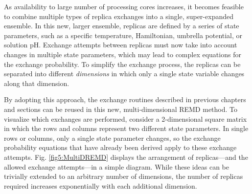 As availability to large number of processing cores increases, it becomes
feasible to combine multiple types of replica exchanges into a single,
super-expanded ensemble. In this new, larger ensemble, replicas are defined by a
series of state parameters, such as a specific temperature, Hamiltonian,
umbrella potential, or solution pH. Exchange attempts between replicas must now
take into account changes in multiple state parameters, which may lead to
complex equations for the exchange probability. To simplify the exchange
process, the replicas can be separated into different \emph{dimensions} in which
only a single state variable changes along that dimension.

By adopting this approach, the exchange routines described in previous chapters
and sections can be reused in this new, multi-dimensional REMD method. To
visualize which exchanges are performed, consider a 2-dimensional square matrix
in which the rows and columns represent two different state parameters. In
single rows or columns, only a single state parameter changes, so the exchange
probability equations that have already been derived apply to these exchange
attempts. Fig. \ref{fig5:MultiDREMD} displays the arrangement of replicas---and
the allowed exchange attempts---in a simple diagram. While these ideas can be
trivially extended to an arbitrary number of dimensions, the number of replicas
required increases exponentially with each additional dimension.

